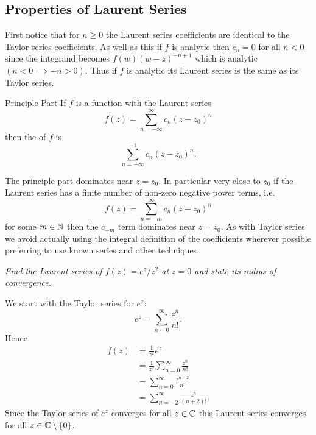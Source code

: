 \documentclass{article}
\begin{document}
    \subsection{Properties of Laurent Series}
    First notice that for \(n \ge 0\) the Laurent series coefficients are identical to the Taylor series coefficients.
    As well as this if \(f\) is analytic then \(c_n = 0\) for all \(n < 0\) since the integrand becomes \(f(w) (w - z)^{-n+1}\) which is analytic \((n < 0 \implies -n > 0)\).
    Thus if \(f\) is analytic its Laurent series is the same as its Taylor series.
    \begin{definition}{Principle Part}{}
        If \(f\) is a function with the Laurent series
        \[f(z) = \sum_{n=-\infty}^{\infty} c_n(z - z_0)^n\]
        then the  of \(f\) is
        \[\sum_{n=-\infty}^{-1}c_n(z - z_0)^n.\]
    \end{definition}
    The principle part dominates near \(z = z_0\).
    In particular very close to \(z_0\) if the Laurent series has a finite number of non-zero negative power terms, i.e.
    \[f(z) = \sum_{n=-m}^{\infty}c_n(z - z_0)^n\]
    for some \(m\in\mathbb{N}\) then the \(c_{-m}\) term dominates near \(z = z_0\).
    As with Taylor series we avoid actually using the integral definition of the coefficients wherever possible preferring to use known series and other techniques.
    \begin{example}
        \textit{Find the Laurent series of \(f(z) = e^z/z^2\) at \(z = 0\) and state its radius of convergence.}
        
        We start with the Taylor series for \(e^z\):
        \[e^z = \sum_{n=0}^{\infty} \frac{z^n}{n!}.\]
        Hence
        \begin{align*}
            f(z) &= \frac{1}{z^2}e^z\\
            &= \frac{1}{z^2} \sum_{n=0}^{\infty} \frac{z^n}{n!}\\
            &= \sum_{n=0}^{\infty} \frac{z^{n-2}}{n!}\\
            &= \sum_{n=-2}^{\infty} \frac{z^n}{(n+2)!}.
        \end{align*}
        Since the Taylor series of \(e^z\) converges for all \(z\in\mathbb{C}\) this Laurent series converges for all \(z\in\mathbb{C}\setminus\{0\}\).
    \end{example}
\end{document}
